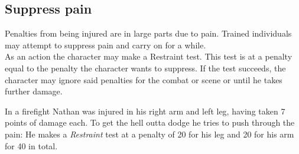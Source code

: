\subsection*{Suppress pain}
Penalties from being injured are in large parts due to pain. Trained individuals may attempt to suppress pain and carry on for a while.\\
As an action the character may make a Restraint test. This test is at a penalty equal to the penalty the character wants to suppress. If the test succeeds, the character may ignore said penalties for the combat or scene or until he takes further damage.
\begin{exampleblock}
	In a firefight Nathan was injured in his right arm and left leg, having taken 7 points of damage each. To get the hell outta dodge he tries to push through the pain: He makes a \emph{Restraint} test at a penalty of 20 for his leg and 20 for his arm for 40 in total.
\end{exampleblock}
